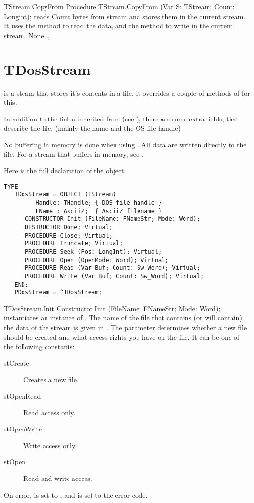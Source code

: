 \begin{procedure}{TStream.CopyFrom}
\Declaration
Procedure TStream.CopyFrom (Var S: TStream; Count: Longint);
\Description
{} reads Count bytes from stream  and stores them
in the current stream. It uses the  method
to read the data, and the  method to
write in the current stream.
\Errors
None.
\SeeAlso
{}, 
\end{procedure}

\section{TDosStream}
\label{se:TDosStream}

 is a steam that stores it's contents in a file.
it overrides a couple of methods of  for this.

In addition to the fields inherited from  (see ),
there are some extra fields, that describe the file. (mainly the name and
the OS file handle)

No buffering in memory is done when using . 
All data are written directly to the file. For a stream that buffers 
in memory, see .

Here is the full declaration of the  object:
\begin{verbatim}
TYPE
   TDosStream = OBJECT (TStream)
         Handle: THandle; { DOS file handle }
         FName : AsciiZ;  { AsciiZ filename }
      CONSTRUCTOR Init (FileName: FNameStr; Mode: Word);
      DESTRUCTOR Done; Virtual;
      PROCEDURE Close; Virtual;
      PROCEDURE Truncate; Virtual;
      PROCEDURE Seek (Pos: LongInt); Virtual;
      PROCEDURE Open (OpenMode: Word); Virtual;
      PROCEDURE Read (Var Buf; Count: Sw_Word); Virtual;
      PROCEDURE Write (Var Buf; Count: Sw_Word); Virtual;
   END;
   PDosStream = ^TDosStream;
\end{verbatim}

\begin{procedure}{TDosStream.Init}
\Declaration
Constructor Init (FileName: FNameStr; Mode: Word);
\Description
{} instantiates an instance of . The name of the 
file that contains (or will contain) the data of the stream is given in
. The  parameter determines whether a new file 
should be created and what access rights you have on the file. 
It can be one of the following constants:
\begin{description}
\item[stCreate] Creates a new file.
\item[stOpenRead] Read access only.
\item[stOpenWrite] Write access only.
\item[stOpen] Read and write access.
\end{description}
\Errors
On error,  is set to , and 
is set to the \dos error code.
\SeeAlso
{}
\end{procedure}

